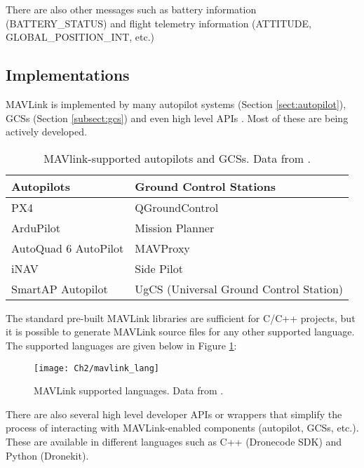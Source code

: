 There are also other messages such as battery information (BATTERY\_STATUS) and flight telemetry information (ATTITUDE, GLOBAL\_POSITION\_INT, etc.)

\subsection{Implementations}
MAVLink is implemented by many autopilot systems (Section  \ref{sect:autopilot}), GCSs (Section  \ref{subsect:gcs}) and even high level APIs \cite{meier2013mavlink}. Most of these are being actively developed. 

\begin{table}[t]
 \caption[MAVlink-supported autopilots and GCSs.]{MAVlink-supported autopilots and GCSs. Data from \protect{}.}
 \begin{center}
     \begin{tabular}{|m{5cm}|m{8cm}|} 
     \hline
     \textbf{Autopilots} & \textbf{Ground Control Stations} \\ [0.5ex] 
     \hline\hline
     PX4 & QGroundControl \\ 
     \hline
     ArduPilot & Mission Planner \\
     \hline
     AutoQuad 6 AutoPilot & MAVProxy\\
     \hline
     iNAV & Side Pilot \\
     \hline
     SmartAP Autopilot & UgCS (Universal Ground Control Station)\\ [1ex] 
     \hline
 \end{tabular}
 \end{center}{}
\end{table}
\FloatBarrier

The standard pre-built MAVLink libraries are sufficient for C/C++ projects, but it is possible to generate MAVLink source files for any other supported language. The supported languages are given below in Figure \ref{fig:lang}:

\begin{figure}[t]
	\texttt{[image: Ch2/mavlink\_lang]}
	\caption{MAVLink supported languages. Data from \protect{}.}
	\label{fig:lang}
\end{figure}
\FloatBarrier

There are also several high level developer APIs or wrappers that simplify the process of interacting with MAVLink-enabled components (autopilot, GCSs, etc.). These are available in different languages such as C++ (Dronecode SDK) and Python (Dronekit).

